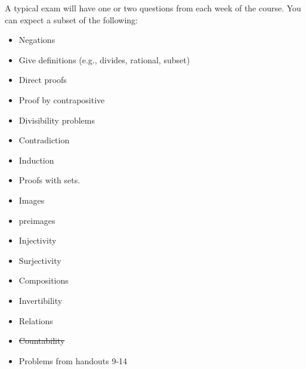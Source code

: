\documentclass[12pt]{article}
\begin{document}
A typical exam will have one or two questions from each week of the course. You can expect a subset of the following:
\begin{itemize}
\item Negations
\item Give definitions (e.g., divides, rational, subset)
\item Direct proofs
\item Proof by contrapositive
\item Divisibility problems
\item Contradiction
\item Induction
\item Proofs with sets. 
\item Images
\item preimages
\item Injectivity 
\item Surjectivity
\item Compositions
\item Invertibility
\item Relations
\item \sout{Countability}
\item Problems from handouts 9-14
\end{itemize}




 
\end{document}
